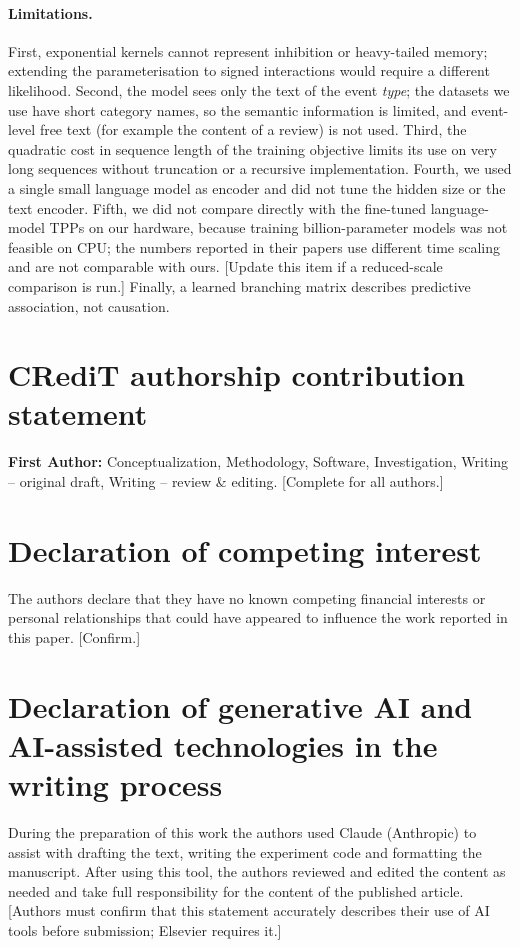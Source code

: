 \documentclass[preprint,12pt,authoryear]{elsarticle}
\newcommand{\todo}[1]{{\color{red}[#1]}}
\begin{document}
\paragraph{Limitations.} First, exponential kernels cannot represent inhibition or heavy-tailed memory; extending the parameterisation to signed interactions would require a different likelihood. Second, the model sees only the text of the event \emph{type}; the datasets we use have short category names, so the semantic information is limited, and event-level free text (for example the content of a review) is not used. Third, the quadratic cost in sequence length of the training objective limits its use on very long sequences without truncation or a recursive implementation. Fourth, we used a single small language model as encoder and did not tune the hidden size or the text encoder. Fifth, we did not compare directly with the fine-tuned language-model TPPs on our hardware, because training billion-parameter models was not feasible on CPU; the numbers reported in their papers use different time scaling and are not comparable with ours. \todo{Update this item if a reduced-scale comparison is run.} Finally, a learned branching matrix describes predictive association, not causation.

\section*{CRediT authorship contribution statement}
\textbf{First Author:} Conceptualization, Methodology, Software, Investigation, Writing -- original draft, Writing -- review \& editing. \todo{Complete for all authors.}

\section*{Declaration of competing interest}
The authors declare that they have no known competing financial interests or personal relationships that could have appeared to influence the work reported in this paper. \todo{Confirm.}

\section*{Declaration of generative AI and AI-assisted technologies in the writing process}
During the preparation of this work the authors used Claude (Anthropic) to assist with drafting the text, writing the experiment code and formatting the manuscript. After using this tool, the authors reviewed and edited the content as needed and take full responsibility for the content of the published article. \todo{Authors must confirm that this statement accurately describes their use of AI tools before submission; Elsevier requires it.}
\end{document}
